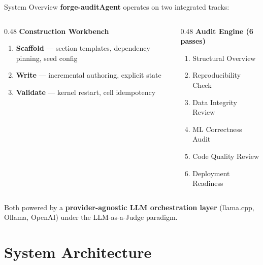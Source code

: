 \documentclass[aspectratio=169,11pt]{beamer}
\begin{document}
\begin{frame}{System Overview}
  \small
  \textbf{forge-auditAgent} operates on two integrated tracks:

  \vspace{0.3em}
  \begin{columns}[T]
    \begin{column}{0.48\textwidth}
      \textbf{Construction Workbench}
      \begin{enumerate}
\setlength\itemsep{0pt}
        \item \textbf{Scaffold} --- section templates, dependency pinning, seed config
        \item \textbf{Write} --- incremental authoring, explicit state
        \item \textbf{Validate} --- kernel restart, cell idempotency
      \end{enumerate}
    \end{column}
    \begin{column}{0.48\textwidth}
      \textbf{Audit Engine (6 passes)}
      \begin{enumerate}
\setlength\itemsep{0pt}
        \item Structural Overview
        \item Reproducibility Check
        \item Data Integrity Review
        \item ML Correctness Audit
        \item Code Quality Review
        \item Deployment Readiness
      \end{enumerate}
    \end{column}
  \end{columns}

  \vspace{0.5em}
  Both powered by a \textbf{provider-agnostic LLM orchestration layer} (llama.cpp, Ollama, OpenAI) under the LLM-as-a-Judge paradigm.
\end{frame}

\section{System Architecture}
\end{document}
